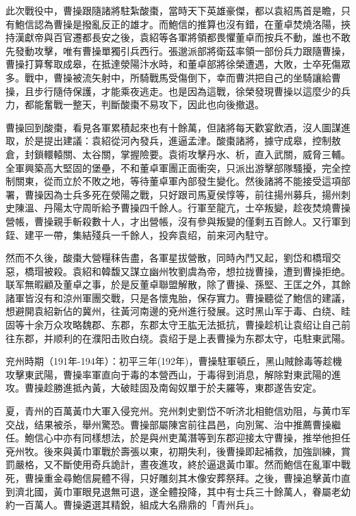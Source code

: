 此次戰役中，曹操跟隨諸將駐紮酸棗，當時天下英雄豪傑，都以袁紹馬首是瞻，只有鮑信認為曹操是撥亂反正的雄才。而鮑信的推算也沒有錯，在董卓焚燒洛陽，挾持漢獻帝與百官遷都長安之後，袁紹等各軍將領都畏懼董卓而按兵不動，誰也不敢先發動攻擊，唯有曹操單獨引兵西行。張邈派部將衛茲率領一部份兵力跟隨曹操，曹操打算奪取成皋，在抵達滎陽汴水時，和董卓部將徐榮遭遇，大敗，士卒死傷眾多。戰中，曹操被流矢射中，所騎戰馬受傷倒下，幸而曹洪把自己的坐騎讓給曹操，且步行隨侍保護，才能乘夜逃走。也是因為這戰，徐榮發現曹操以這麼少的兵力，都能奮戰一整天，判斷酸棗不易攻下，因此也向後撤退。

曹操回到酸棗，看見各軍累積起來也有十餘萬，但諸將每天歡宴飲酒，沒人圖謀進取，於是提出建議：袁紹從河內發兵，進逼孟津。酸棗諸將，據守成皋，控制敖倉，封鎖轘轅關、太谷關，掌握險要。袁術攻擊丹水、析，直入武關，威脅三輔。全軍興築高大堅固的堡壘，不和董卓軍團正面衝突，只派出游擊部隊騷擾，完全控制關東，從而立於不敗之地，等待董卓軍內部發生變化。然後諸將不能接受這項部署，曹操因為士兵多死在滎陽之戰，只好跟司馬夏侯惇等，前往揚州募兵，揚州刺史陳溫、丹陽太守周昕給予曹操四千餘人。行軍至龍亢，士卒叛變，趁夜焚燒曹操營帳，曹操親手斬殺數十人，才出營帳，沒有參與叛變的僅剩五百餘人。又行軍到銍、建平一帶，集結殘兵一千餘人，投奔袁绍，前来河內駐守。

然而不久後，酸棗大營糧秣告盡，各軍星拔營散，同時內鬥又起，劉岱和橋瑁交惡，橋瑁被殺。袁紹和韓馥又謀立幽州牧劉虞為帝，想拉拢曹操，遭到曹操拒绝。联军無暇顧及董卓之事，於是反董卓聯盟解散，除了曹操、孫堅、王匡之外，其餘諸軍皆沒有和涼州軍團交戰，只是各懷鬼胎，保存實力。曹操聽從了鮑信的建議，想避開袁紹新佔的冀州，往黃河南邊的兗州進行發展。这时黑山军于毒、白绕、眭固等十余万众攻略魏郡、东郡，东郡太守王肱无法抵抗，曹操趁机让袁绍让自己前往东郡，并顺利的在濮阳击败白绕。袁绍于是上表曹操为东郡太守，屯駐東武陽。

兖州時期（191年-194年）：初平三年(192年)，曹操駐軍頓丘，黑山賊餘毒等趁機攻擊東武陽，曹操率軍直向于毒的本營西山，于毒得到消息，解除對東武陽的進攻。曹操趁勝進抵內黃，大破眭固及南匈奴單于於夫羅等，東郡遂告安定。

夏，青州的百萬黃巾大軍入侵兖州。兖州刺史劉岱不听济北相鲍信劝阻，与黄巾军交战，结果被杀，舉州驚恐。曹操部屬陳宮前往昌邑，向別駕、治中推薦曹操繼任。鮑信心中亦有同樣想法，於是與州吏萬潛等到东郡迎接太守曹操，推举他担任兗州牧。後來與黃巾軍戰於壽張以東，初期失利，後曹操即起補救，加強訓練，賞罰嚴格，又不斷使用奇兵詭計，晝夜進攻，終於逼退黃巾軍。然而鮑信在亂軍中戰死，曹操重金尋鮑信屍體不得，只好雕刻其木像安葬祭拜。之後，曹操追擊黃巾直到濟北國，黃巾軍眼見退無可退，遂全體投降，其中有士兵三十餘萬人，眷屬老幼約一百萬人。曹操遴選其精銳，組成大名鼎鼎的「青州兵」。


